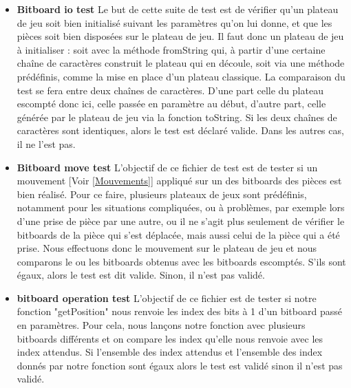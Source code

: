 \huge\documentclass{article}
\begin{document}
\begin{itemize}
    \item \textbf{Bitboard io test}\newline 
    Le but de cette suite de test est de vérifier qu'un plateau de jeu soit bien initialisé suivant les paramètres qu'on lui donne, et que les pièces soit bien disposées sur le plateau de jeu.\newline
    Il faut donc un plateau de jeu à initialiser : soit avec la méthode fromString qui, à partir d'une certaine chaîne de caractères construit le plateau qui en découle, soit via une méthode prédéfinis, comme la mise en place d'un plateau classique.\newline
    La comparaison du test se fera entre deux chaînes de caractères. 
    D'une part celle du plateau escompté donc ici, celle passée en paramètre au début, d'autre part, celle générée par le plateau de jeu via la fonction toString.
    Si les deux chaînes de caractères sont identiques, alors le test est déclaré valide.
    Dans les autres cas, il ne l'est pas.\newline
    
    
    \item \textbf{Bitboard move test} \newline
    L'objectif de ce fichier de test est de tester si un mouvement [Voir \ref{Mouvements}] appliqué sur un des bitboards \cite{Bitboards} des pièces est bien réalisé.\newline
    Pour ce faire, plusieurs plateaux de jeux sont prédéfinis, notamment pour les situations compliquées, ou à problèmes, par exemple lors d'une prise de pièce par une autre, ou il ne s'agit plus seulement de vérifier le bitboards de la pièce qui s'est déplacée, mais aussi celui de la pièce qui a été prise.\newline
    Nous effectuons donc le mouvement sur le plateau de jeu et nous comparons le ou les bitboards obtenus avec les bitboards escomptés.\newline
    S'ils sont égaux, alors le test est dit valide.
    Sinon, il n'est pas validé.\newline
    
    \item \textbf{bitboard operation test}\newline
    L'objectif de ce fichier est de tester si notre fonction "getPosition" nous renvoie les index des bits à 1 d'un bitboard passé en paramètres.\newline
    Pour cela, nous lançons notre fonction avec plusieurs bitboards différents et on compare les index qu'elle nous renvoie avec les index attendus.\newline
    Si l'ensemble des index attendus et l'ensemble des index donnés par notre fonction sont égaux alors le test est validé sinon il n'est pas validé.\newline
    

\end{itemize}
\end{document}
